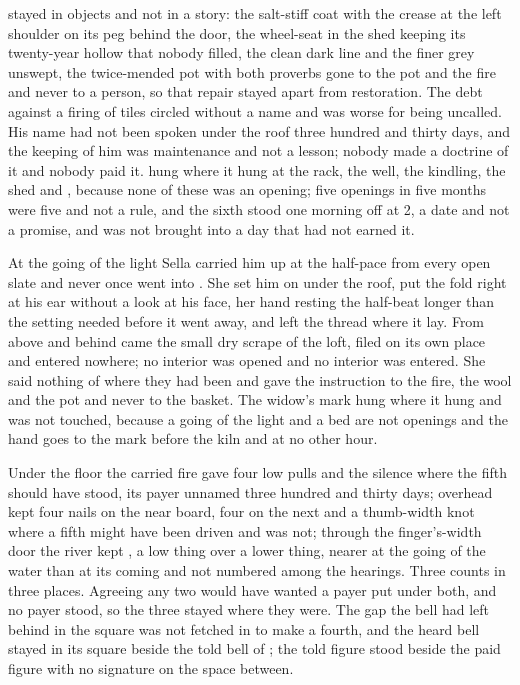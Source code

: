  stayed in objects and not in a story: the salt-stiff coat with the crease at the left shoulder on its peg behind the door, the wheel-seat in the shed keeping its twenty-year hollow that nobody filled, the clean dark line and the finer grey unswept, the twice-mended pot with both proverbs gone to the pot and the fire and never to a person, so that repair stayed apart from restoration. The debt against a firing of tiles circled without a name and was worse for being uncalled. His name had not been spoken under the roof three hundred and thirty days, and the keeping of him was maintenance and not a lesson; nobody made a doctrine of it and nobody paid it.  hung where it hung at the rack, the well, the kindling, the shed and , because none of these was an opening; five openings in five months were five and not a rule, and the sixth stood one morning off at  2, a date and not a promise, and was not brought into a day that had not earned it.

\scenebreak

At the going of the light Sella carried him up at the half-pace from every open slate and never once went into . She set him on  under the roof, put the fold right at his ear without a look at his face, her hand resting the half-beat longer than the setting needed before it went away, and left the thread where it lay. From above and behind came the small dry scrape of the loft, filed on its own place and entered nowhere; no interior was opened and no interior was entered. She said nothing of where they had been and gave the instruction to the fire, the wool and the pot and never to the basket. The widow's mark hung where it hung and was not touched, because a going of the light and a bed are not openings and the hand goes to the mark before the kiln and at no other hour.

Under the floor the carried fire gave four low pulls and the silence where the fifth should have stood, its payer unnamed three hundred and thirty days; overhead  kept four nails on the near board, four on the next and a thumb-width knot where a fifth might have been driven and was not; through the finger's-width door the river kept , a low thing over a lower thing, nearer at the going of the water than at its coming and not numbered among the hearings. Three counts in three places. Agreeing any two would have wanted a payer put under both, and no payer stood, so the three stayed where they were. The gap the bell had left behind in the square was not fetched in to make a fourth, and the heard bell stayed in its square beside the told bell of ; the told figure stood beside the paid figure with no signature on the space between.

